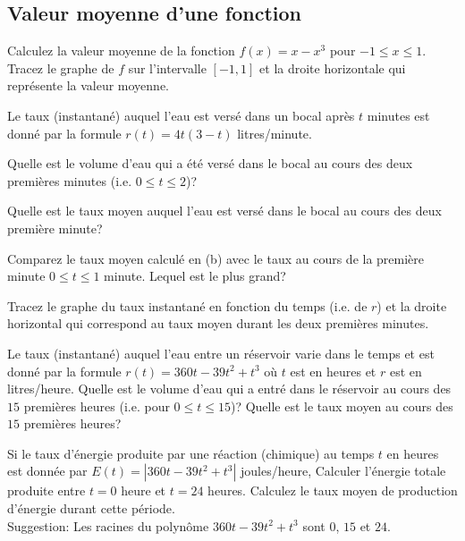 \subsection{Valeur moyenne d'une fonction}

\begin{question}
Calculez la valeur moyenne de la fonction $f(x) = x-x^3$ pour
$-1 \leq x \leq 1$.  Tracez le graphe de $f$ sur l'intervalle $[-1,1]$ et la
droite horizontale qui représente la valeur moyenne.
\label{8Q4}
\end{question}

\begin{question}
Le taux (instantané) auquel l'eau est versé dans un bocal après $t$
minutes est donné par la formule $r(t) = 4t(3-t)$ litres/minute.

 Quelle est le volume d'eau qui a été versé dans le bocal au
cours des deux premières minutes (i.e. $0\leq t \leq 2$)?

 Quelle est le taux moyen auquel l'eau est versé dans le bocal
au cours des deux première minute?

 Comparez le taux moyen calculé en (b) avec le taux au
cours de la première minute $0 \leq t \leq 1$ minute.  Lequel est le plus
grand?

 Tracez le graphe du taux instantané en fonction du temps
(i.e. de $r$) et la droite horizontal qui correspond au taux moyen
durant les deux premières minutes.
\label{8Q5}
\end{question}

\begin{question}
Le taux (instantané) auquel l'eau entre un réservoir varie dans le temps et
est donné par la formule $r(t) = 360t -39t^2+t^3$ où $t$ est en heures et $r$
est en litres/heure.  Quelle est le volume d'eau qui a entré dans le
réservoir au cours des $15$ premières heures (i.e. pour $0\leq t \leq 15$)?
Quelle est le taux moyen au cours des $15$ premières heures?
\label{8Q6}
\end{question}

\begin{question}[\eng]
Si le taux d'énergie produite par une réaction (chimique) au temps
$t$ en heures est donnée par $E(t) = | 360t -39t^2+t^3|$ joules/heure,
Calculer l'énergie totale produite entre $t=0$ heure et $t= 24$
heures. Calculez le taux moyen de production d'énergie durant cette
période.\\
Suggestion: Les racines du polynôme $360t -39t^2+t^3$ sont
$0$, $15$ et $24$.
\label{8Q7}
\end{question}

